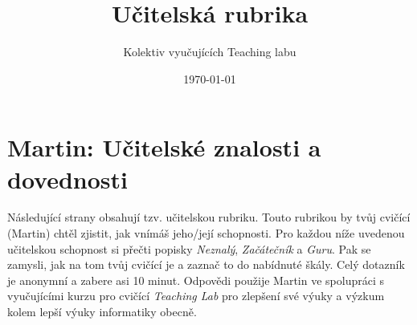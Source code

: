 \documentclass{article}
\title{Učitelská rubrika}
\author{Kolektiv vyučujících Teaching labu}
\date{\today}
\newcommand{\teacherName}{Martin\xspace}
\begin{document}
\section*{\teacherName: Učitelské znalosti a dovednosti}
\label{rubric}

\begin{onehalfspace}
\large 
Následující strany obsahují tzv. učitelskou rubriku. Touto rubrikou by tvůj cvičící (\teacherName) chtěl zjistit, jak vnímáš jeho/její schopnosti. Pro každou níže uvedenou učitelskou schopnost si přečti popisky \textit{Neznalý}, \textit{Začátečník} a \textit{Guru}. Pak se zamysli, jak na tom tvůj cvičící je a zaznač to do nabídnuté škály. Celý dotazník je anonymní a zabere asi 10 minut. Odpovědi použije \teacherName ve spolupráci s vyučujícími kurzu pro cvičící \textit{Teaching Lab} pro zlepšení své výuky a výzkum kolem lepší výuky informatiky obecně.
\end{onehalfspace}
\bigskip
\end{document}
